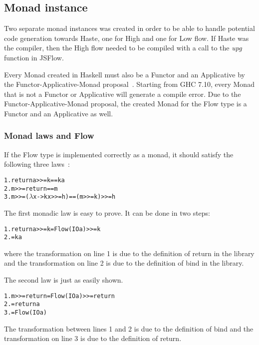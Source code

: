 \subsection{Monad instance}
Two separate monad instances was created in order to be able to handle potential code generation towards Haste, one for High and one for Low flow. If Haste was the compiler, then the High flow needed to be compiled with a call to the \emph{upg} function in JSFlow.

Every Monad created in Haskell must also be a Functor and an Applicative by the Functor-Applicative-Monad proposal~\cite{functor_applicative_monad}. Starting from GHC 7.10, every Monad that is not a Functor or Applicative will generate a compile error. Due to the Functor-Applicative-Monad proposal, the created Monad for the Flow type is a Functor and an Applicative as well.
\subsubsection{Monad laws and Flow}
\label{chapter:monad-laws}
If the Flow type is implemented correctly as a monad, it should satisfy the following three laws~\cite{functor-monad-law}:
\begin{alltt}
  1.  return a >>= k  ==  k a
  2.  m >>= return  ==  m
  3.  m >>= (\(\lambda\)x -> k x >>= h)  ==  (m >>= k) >>= h
\end{alltt}
The first monadic law is easy to prove. It can be done in two steps:
\begin{alltt}
  1. return a >>= k = Flow (IO a) >>= k
  2.                = k a
\end{alltt}
where the transformation on line 1 is due to the definition of return in the library and the transformation on line 2 is due to the definition of bind in the library.

The second law is just as easily shown.
\begin{alltt}
  1. m >>= return = Flow (IO a) >>= return
  2.              = return a
  3.              = Flow (IO a)
\end{alltt}
The transformation between lines 1 and 2 is due to the definition of bind and the transformation on line 3 is due to the definition of return.

